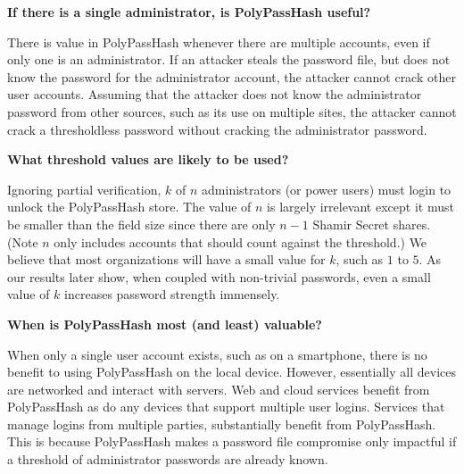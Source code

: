 {\bf If there is a single administrator, is PolyPassHash useful?}

There is value in PolyPassHash whenever there are multiple
accounts, even if only one is an administrator.   If an attacker steals the
password file, but does not know the password for the administrator account, 
the attacker cannot crack other user accounts.   
Assuming that the attacker does not know the administrator password
from other sources, such as its use on multiple sites, the 
attacker cannot crack a thresholdless password without cracking 
the administrator password.


{\bf What threshold values are likely to be used?}

Ignoring partial verification,
$k$ of $n$ administrators (or power users) must login to unlock the
PolyPassHash store.   The value of $n$ is largely irrelevant
except it must be smaller than the field size since there are only $n-1$ 
Shamir Secret shares.   (Note $n$ only includes accounts that should count
against the threshold.)
%
We believe that most organizations will have a small 
value for $k$, such as $1$ to $5$.   As our results later show, 
when coupled with non-trivial passwords, even a small value of $k$ 
increases password strength immensely.



{\bf When is PolyPassHash most (and least) valuable?}

When only a single user account exists, such as on a smartphone, 
there is no benefit to using PolyPassHash on the local device.   However, 
essentially all devices are networked and interact with servers.   Web and 
cloud services benefit from PolyPassHash as do any devices that support
multiple user logins.   
Services that manage logins from multiple parties, substantially benefit from
PolyPassHash.     This is because PolyPassHash makes 
a password file compromise only impactful if a threshold of administrator
passwords are already known.   %


